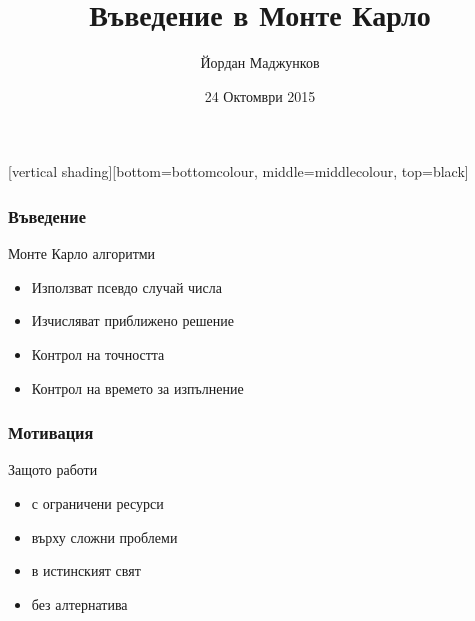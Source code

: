\documentclass[serif,mathserif,14pt]{beamer}
\author[Йордан Маджунков]{Йордан Маджунков}
\title[Монте Карло\hspace{2em}\insertframenumber/\inserttotalframenumber]{Въведение в Монте Карло}
\date{24 Октомври 2015} %
\begin{document}
\maketitle

[vertical shading][bottom=bottomcolour, middle=middlecolour, top=black]
\begin{frame}
  \frametitle{Въведение}
  Монте Карло алгоритми\pause
  \begin{itemize}
  \item Използват псевдо случай числа\pause
  \item Изчисляват приближено решение\pause
  \item Контрол на точността\pause
  \item Контрол на времето за изпълнение %
  \end{itemize}
\end{frame}

\begin{frame}
  \frametitle{Мотивация}
  \pause
  Защото работи\pause
  \begin{itemize}
  \item с ограничени ресурси\pause
  \item върху сложни проблеми\pause
  \item в истинският свят\pause
  \item без алтернатива
  \end{itemize}
\end{frame}
\end{document}

